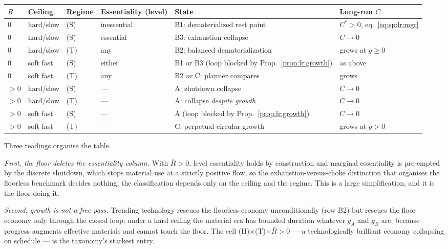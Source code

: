 \begin{center}
\begin{tabular}{llllll}
\toprule
$\bar R$ & Ceiling & Regime & Essentiality (level) & State & Long-run $C$ \\
\midrule
$0$ & hard/slow & (S) & inessential & B1: dematerialized rest point & $C^*>0$, eq.~\eqref{eq:sp:lr:mgr} \\
$0$ & hard/slow & (S) & essential & B3: exhaustion collapse & $C\to0$ \\
$0$ & hard/slow & (T) & any & B2: balanced dematerialization & grows at $g\ge0$ \\
$0$ & soft fast & (S) & either & B1 or B3 (loop blocked by Prop.~\ref{prop:lr:growth}) & as above \\
$0$ & soft fast & (T) & any & B2 \emph{or} C: planner compares & grows \\
\midrule
$>0$ & hard/slow & (S) & --- & A: shutdown collapse & $C\to0$ \\
$>0$ & hard/slow & (T) & --- & A: collapse \emph{despite growth} & $C\to0$ \\
$>0$ & soft fast & (S) & --- & A (loop blocked by Prop.~\ref{prop:lr:growth}) & $C\to0$ \\
$>0$ & soft fast & (T) & --- & C: perpetual circular growth & grows at $g>0$ \\
\bottomrule
\end{tabular}
\end{center}

Three readings organise the table.

\emph{First, the floor deletes the essentiality column.} With $\bar R>0$, level essentiality holds by construction and marginal essentiality is pre-empted by the discrete shutdown, which stops material use at a strictly positive flow, so the exhaustion-versus-choke distinction that organises the floorless benchmark decides nothing; the classification depends only on the ceiling and the regime. This is a large simplification, and it is the floor doing it.

\emph{Second, growth is not a free pass.} Trending technology rescues the floorless economy unconditionally (row B2) but rescues the floor economy only through the closed loop: under a hard ceiling the material era has bounded duration whatever $g_A$ and $g_B$ are, because progress augments effective materials and cannot touch the floor. The cell (H)$\times$(T)$\times\bar R>0$ --- a technologically brilliant economy collapsing on schedule --- is the taxonomy's starkest entry.

